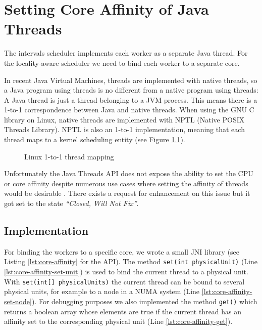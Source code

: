 
\chapter{Setting Core Affinity of Java Threads}
\label{chap:appendix-core-affinity}

The intervals scheduler implements each worker as a separate Java
thread. For the locality-aware scheduler we need to bind each worker
to a separate core.

In recent Java Virtual Machines, threads are implemented with native
threads, so a Java program using threads is no different from a native
program using threads: A Java thread is just a thread belonging to a
JVM process. This means there is a 1-to-1 correspondence between Java
and native threads. When using the GNU C library on Linux, native
threads are implemented with NPTL (Native POSIX Threads Library). NPTL
is also an 1-to-1 implementation, meaning that each thread maps to a
kernel scheduling entity (see Figure
\ref{fig:core-affinity-thread-mapping}).

\begin{figure}[htb]
  \centering
  \caption{Linux 1-to-1 thread mapping}
  \label{fig:core-affinity-thread-mapping}
\end{figure}

Unfortunately the Java Threads API does not expose the ability to set
the CPU or core affinity despite numerous use cases where setting the
affinity of threads would be desirable \cite{Love2003, Dow2005,
  Foong2008}.  There exists a request for enhancement
\cite{Oracle1999} on this issue but it got set to the state
\emph{``Closed, Will Not Fix''}.


\section{Implementation}
\label{sec:appendix-core-affinity-implementation}

For binding the workers to a specific core, we wrote a small JNI
library (see Listing \ref{lst:core-affinity} for the API). The method
\lstinline!set(int physicalUnit)!  (Line
\ref{lst:core-affinity-set-unit}) is used to bind the current thread
to a physical unit. With \lstinline!set(int[] physicalUnits)! the
current thread can be bound to several physical units, for example to
a node in a NUMA system (Line \ref{lst:core-affinity-set-node}). For
debugging purposes we also implemented the method \lstinline!get()!
which returns a boolean array whose elements are true if the current
thread has an affinity set to the corresponding physical unit (Line
\ref{lst:core-affinity-get}).

